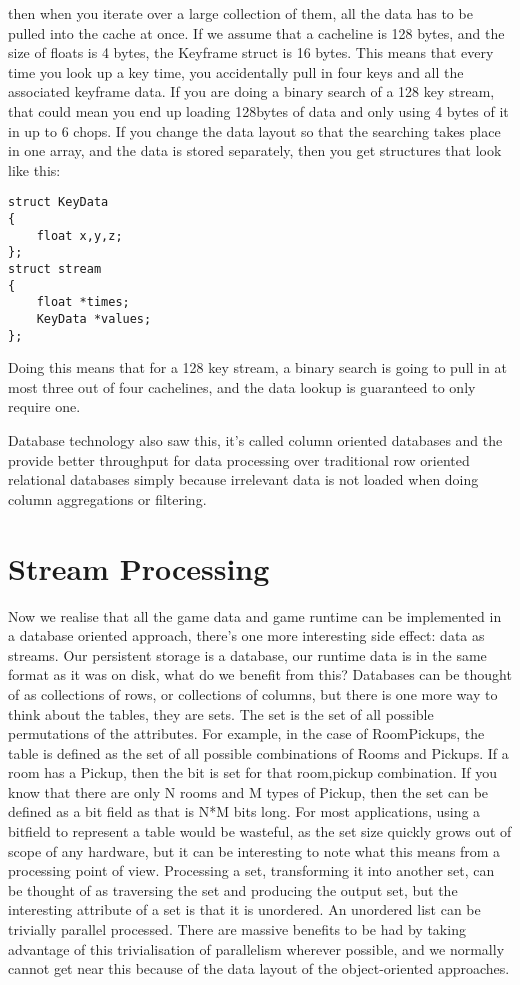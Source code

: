 then when you iterate over a large collection of them, all the data has to be
pulled into the cache at once. If we assume that a cacheline is 128 bytes, and
the size of floats is 4 bytes, the Keyframe struct is 16 bytes.  This means
that every time you look up a key time, you accidentally pull in four keys and
all the associated keyframe data. If you are doing a binary search of a 128 key
stream, that could mean you end up loading 128bytes of data and only using 4
bytes of it in up to 6 chops. If you change the data layout so that the
searching takes place in one array, and the data is stored separately, then you
get structures that look like this:

\begin{lstlisting}[caption=struct of arrays]
struct KeyData
{
	float x,y,z;
};
struct stream
{
	float *times;
	KeyData *values;
};
\end{lstlisting}
\label{src:SoAclass}

Doing this means that for a 128 key stream, a binary search is going to pull in
at most three out of four cachelines, and the data lookup is guaranteed to only
require one.

Database technology also saw this, it's called column oriented databases and
the provide better throughput for data processing over traditional row oriented
relational databases simply because irrelevant data is not loaded when doing
column aggregations or filtering.

\section{Stream Processing}

Now we realise that all the game data and game runtime can be implemented in a
database oriented approach, there's one more interesting side effect: data as
streams. Our persistent storage is a database, our runtime data is in the same
format as it was on disk, what do we benefit from this? Databases can be
thought of as collections of rows, or collections of columns, but there is one
more way to think about the tables, they are sets. The set is the set of all
possible permutations of the attributes. For example, in the case of
RoomPickups, the table is defined as the set of all possible combinations of
Rooms and Pickups. If a room has a Pickup, then the bit is set for that
room,pickup combination. If you know that there are only N rooms and M types of
Pickup, then the set can be defined as a bit field as that is N*M bits long.
For most applications, using a bitfield to represent a table would be wasteful,
as the set size quickly grows out of scope of any hardware, but it can be
interesting to note what this means from a processing point of view. Processing
a set, transforming it into another set, can be thought of as traversing the
set and producing the output set, but the interesting attribute of a set is
that it is unordered. An unordered list can be trivially parallel processed.
There are massive benefits to be had by taking advantage of this trivialisation
of parallelism wherever possible, and we normally cannot get near this because
of the data layout of the object-oriented approaches.


